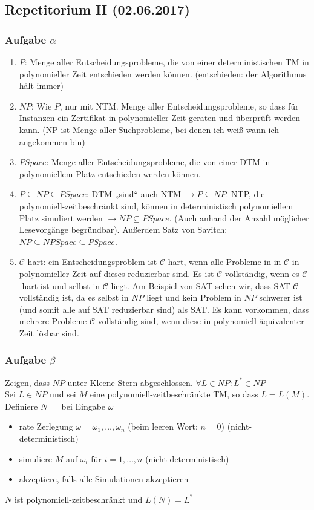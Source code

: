 \subsection*{Repetitorium II (02.06.2017)}
\subsubsection*{Aufgabe $\alpha$}
    \begin{enumerate}
        \item $P$: Menge aller Entscheidungsprobleme, die von einer deterministischen TM in polynomieller Zeit entschieden werden können. (entschieden: der Algorithmus hält immer)
        \item $NP$: Wie $P$, nur mit NTM. Menge aller Entscheidungsprobleme, so dass für Instanzen ein Zertifikat in polynomieller Zeit geraten und überprüft werden kann. (NP ist Menge aller Suchprobleme, bei denen ich weiß wann ich angekommen bin)
        \item $PSpace$: Menge aller Entscheidungsprobleme, die von einer DTM in polynomiellem Platz entschieden werden können.
        \item $P \subseteq NP \subseteq PSpace$: DTM „sind“ auch NTM $\to P \subseteq NP$. NTP, die polynomiell-zeitbeschränkt sind, können in deterministisch polynomiellem Platz simuliert werden $\to NP \subseteq PSpace$. (Auch anhand der Anzahl möglicher Lesevorgänge begründbar). Außerdem Satz von Savitch: $NP \subseteq NPSpace \subseteq PSpace$.
        \item $\mathcal{C}$-hart: ein Entscheidungsproblem ist $\mathcal{C}$-hart, wenn alle Probleme in in $\mathcal{C}$ in polynomieller Zeit auf dieses reduzierbar sind. Es ist $\mathcal{C}$-vollständig, wenn es $\mathcal{C}$-hart ist und selbst in $\mathcal{C}$ liegt. Am Beispiel von SAT sehen wir, dass SAT $\mathcal{C}$-vollständig ist, da es selbst in $NP$ liegt und kein Problem in $NP$ schwerer ist (und somit alle auf SAT reduzierbar sind) als SAT. Es kann vorkommen, dass mehrere Probleme $\mathcal{C}$-vollständig sind, wenn diese in polynomiell äquivalenter Zeit lösbar sind.
    \end{enumerate}

\subsubsection*{Aufgabe $\beta$}
    Zeigen, dass $NP$ unter Kleene-Stern abgeschlossen. $\forall L \in \mathit{NP}: L^{*} \in \mathit{NP}$ \\
    Sei $L \in \mathit{NP}$ und sei $M$ eine polynomiell-zeitbeschränkte TM, so dass $L = L(M)$. \\
    Definiere $N = $ bei Eingabe $\omega$
    \begin{itemize}
        \item rate Zerlegung $\omega = \omega_{1},\dots,\omega_{n}$ (beim leeren Wort: $n=0$) (nicht-deterministisch)
        \item simuliere $M$ auf $\omega_{i}$ für $i = 1,\dots,n$ (nicht-deterministisch)
        \item akzeptiere, falls alle Simulationen akzeptieren
    \end{itemize}
    $N$ ist polynomiell-zeitbeschränkt und $L(N) = L^{*}$


